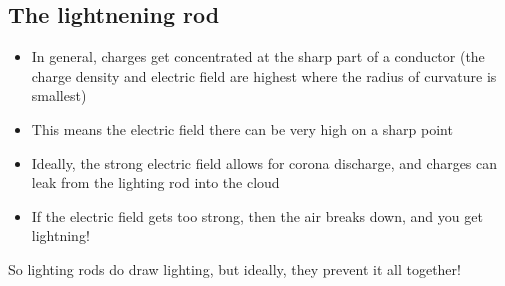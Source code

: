 \documentclass[aspectratio=169,
hyperref={colorlinks,urlcolor=blue}
]{beamer}
\begin{document}
\subsection{The lightnening rod}
\label{subsec:thelightningrod}
{

\begin{itemize}
  \item In general, charges get concentrated at the sharp part of a conductor (the charge density and electric field are highest where the radius of curvature is smallest)
  \item This means the electric field there can be very high on a sharp point
  \item[$\rightarrow$] Ideally, the strong electric field allows for corona discharge, and charges can leak from the lighting rod into the cloud
  \item[$\rightarrow$] If the electric field gets too strong, then the air breaks down, and you get lightning!
\end{itemize}
So lighting rods do draw lighting, but ideally, they prevent it all together!
}
{
\vspace{-1cm}
\vspace{-1cm}
 \begin{columns} 
 \end{columns}
}



\end{document}
